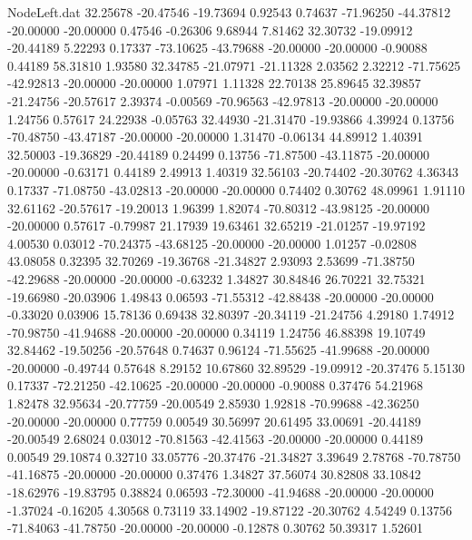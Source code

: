 \begin{filecontents}{NodeLeft.dat}
  32.25678  -20.47546  -19.73694     0.92543    0.74637  -71.96250  -44.37812  -20.00000  -20.00000    0.47546   -0.26306    9.68944    7.81462
  32.30732  -19.09912  -20.44189     5.22293    0.17337  -73.10625  -43.79688  -20.00000  -20.00000   -0.90088    0.44189   58.31810    1.93580
  32.34785  -21.07971  -21.11328     2.03562    2.32212  -71.75625  -42.92813  -20.00000  -20.00000    1.07971    1.11328   22.70138   25.89645
  32.39857  -21.24756  -20.57617     2.39374   -0.00569  -70.96563  -42.97813  -20.00000  -20.00000    1.24756    0.57617   24.22938   -0.05763
  32.44930  -21.31470  -19.93866     4.39924    0.13756  -70.48750  -43.47187  -20.00000  -20.00000    1.31470   -0.06134   44.89912    1.40391
  32.50003  -19.36829  -20.44189     0.24499    0.13756  -71.87500  -43.11875  -20.00000  -20.00000   -0.63171    0.44189    2.49913    1.40319
  32.56103  -20.74402  -20.30762     4.36343    0.17337  -71.08750  -43.02813  -20.00000  -20.00000    0.74402    0.30762   48.09961    1.91110
  32.61162  -20.57617  -19.20013     1.96399    1.82074  -70.80312  -43.98125  -20.00000  -20.00000    0.57617   -0.79987   21.17939   19.63461
  32.65219  -21.01257  -19.97192     4.00530    0.03012  -70.24375  -43.68125  -20.00000  -20.00000    1.01257   -0.02808   43.08058    0.32395
  32.70269  -19.36768  -21.34827     2.93093    2.53699  -71.38750  -42.29688  -20.00000  -20.00000   -0.63232    1.34827   30.84846   26.70221
  32.75321  -19.66980  -20.03906     1.49843    0.06593  -71.55312  -42.88438  -20.00000  -20.00000   -0.33020    0.03906   15.78136    0.69438
  32.80397  -20.34119  -21.24756     4.29180    1.74912  -70.98750  -41.94688  -20.00000  -20.00000    0.34119    1.24756   46.88398   19.10749
  32.84462  -19.50256  -20.57648     0.74637    0.96124  -71.55625  -41.99688  -20.00000  -20.00000   -0.49744    0.57648    8.29152   10.67860
  32.89529  -19.09912  -20.37476     5.15130    0.17337  -72.21250  -42.10625  -20.00000  -20.00000   -0.90088    0.37476   54.21968    1.82478
  32.95634  -20.77759  -20.00549     2.85930    1.92818  -70.99688  -42.36250  -20.00000  -20.00000    0.77759    0.00549   30.56997   20.61495
  33.00691  -20.44189  -20.00549     2.68024    0.03012  -70.81563  -42.41563  -20.00000  -20.00000    0.44189    0.00549   29.10874    0.32710
  33.05776  -20.37476  -21.34827     3.39649    2.78768  -70.78750  -41.16875  -20.00000  -20.00000    0.37476    1.34827   37.56074   30.82808
  33.10842  -18.62976  -19.83795     0.38824    0.06593  -72.30000  -41.94688  -20.00000  -20.00000   -1.37024   -0.16205    4.30568    0.73119
  33.14902  -19.87122  -20.30762     4.54249    0.13756  -71.84063  -41.78750  -20.00000  -20.00000   -0.12878    0.30762   50.39317    1.52601

\end{filecontents}
